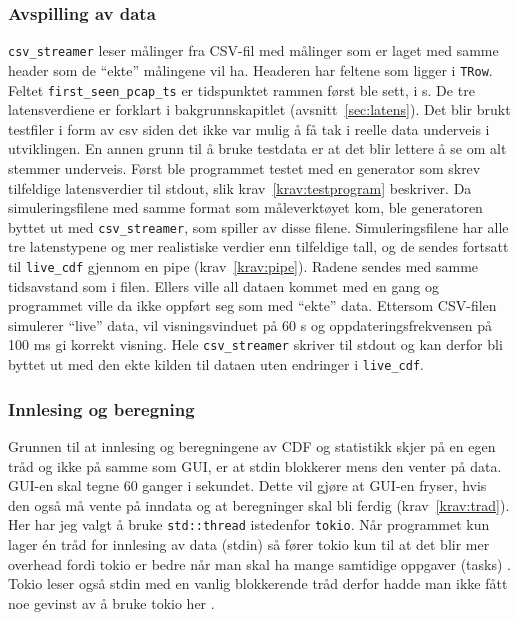 \documentclass[norsk]{uiobachelorthesis}
\begin{document}
  \subsubsection{Avspilling av data}
  \label{sec:avspilling}
  \texttt{csv\_streamer} leser målinger fra CSV-fil med målinger som er laget med samme header som de \enquote{ekte} målingene vil ha. Headeren har feltene som ligger i \texttt{TRow}. Feltet \texttt{first\_seen\_pcap\_ts} er tidspunktet rammen først ble sett, i \textmu{}s. De tre latensverdiene er forklart i bakgrunnskapitlet (avsnitt~\ref{sec:latens}). Det blir brukt testfiler i form av csv siden det ikke var mulig å få tak i reelle data underveis i utviklingen. En annen grunn til å bruke testdata er at det blir lettere å se om alt stemmer underveis. Først ble programmet testet med en generator som skrev tilfeldige latensverdier til stdout, slik krav~\ref{krav:testprogram} beskriver. Da simuleringsfilene med samme format som måleverktøyet kom, ble generatoren byttet ut med \texttt{csv\_streamer}, som spiller av disse filene. Simuleringsfilene har alle tre latenstypene og mer realistiske verdier enn tilfeldige tall, og de sendes fortsatt til \texttt{live\_cdf} gjennom en pipe (krav~\ref{krav:pipe}). Radene sendes med samme tidsavstand som i filen. Ellers ville all dataen kommet med en gang og programmet ville da ikke oppført seg som med \enquote{ekte} data. Ettersom CSV-filen simulerer \enquote{live} data, vil visningsvinduet på 60 s og oppdateringsfrekvensen på 100 ms gi korrekt visning. Hele \texttt{csv\_streamer} skriver til stdout og kan derfor bli byttet ut med den ekte kilden til dataen uten endringer i \texttt{live\_cdf}.
  
    
\subsubsection{Innlesing og beregning}
\label{sec:innlesning}
Grunnen til at innlesing og beregningene av CDF og statistikk skjer på en egen tråd og ikke på samme som GUI, er at stdin blokkerer mens den venter på data. GUI-en skal tegne 60 ganger i sekundet. Dette vil gjøre at GUI-en fryser, hvis den også må vente på inndata og at beregninger skal bli ferdig (krav~\ref{krav:trad}). Her har jeg valgt å bruke \texttt{std::thread} istedenfor \texttt{tokio}. Når programmet kun lager én tråd for innlesing av data (stdin) så fører tokio kun til at det blir mer overhead fordi tokio er bedre når man skal ha mange samtidige oppgaver (tasks) \parencite{tokio_tutorial}. Tokio leser også stdin med en vanlig blokkerende tråd derfor hadde man ikke fått noe gevinst av å bruke tokio her \parencite{tokio_stdin}.
\end{document}
